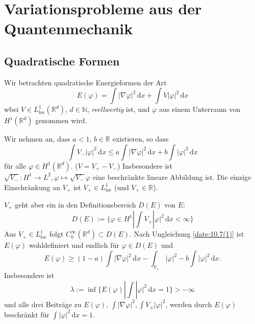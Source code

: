 \documentclass[
paper=a4,
bibtotocnumbered,
liststotocnumbered,
tablecaptionabove,
pointlessnumbers,
twoside,
openright,
10pt
]
{report}
\let\phi\varphi
\theoremstyle{definition}
\numberwithin{equation}{chapter}
\begin{document}
\chapter{Variationsprobleme aus der Quantenmechanik}
\section{Quadratische Formen}
Wir betrachten quadratische Energieformen der Art
\begin{equation}
E(\phi) = \int |\nabla \phi|^2\, \mathrm dx + \int V|\phi|^2\, \mathrm dx
\end{equation}
wbei $V\in L_{\text{loc}}^1(\mathbb R^d)$, $d\in \mathbb N$, \emph{reellwertig} ist, und $\phi$ aus einem Unterraum von $H^1(\mathbb R^d)$ genommen wird. 

Wir nehmen an, dass $a<1$, $b\in \mathbb R$ existieren, so dass 
\begin{equation}\label{date:10.7(1)}
\int V_- |\phi|^2\, \mathrm dx \le a \int |\nabla \phi|^2\, \mathrm dx + b \int |\phi|^2\, \mathrm dx
\end{equation}
für alle $\phi \in H^1(\mathbb R^d)$. ($V= V_+ - V_-$) Insbesondere ist $\sqrt{V_-}: H^1 \to L^2, \phi \mapsto \sqrt{V_-} \phi$ eine beschränkte lineare Abbildung ist.  Die einzige Einschränkung an $V_+$ ist $V_+ \in L^1_{\text{loc}}$ (und $V_+ \in \mathbb R$).

$V_+$ geht aber ein in den Definitionsbereich $D(E)$ von $E$:
\begin{equation}
D(E) := \{ \phi \in H^1| \int V_+ |\phi|^2\, \mathrm dx <\infty\}
\end{equation}
Aus $V_+\in L^1_{\text{loc}}$ folgt $C_0^\infty(\mathbb R^d)\subset D(E)$. Nach Ungleichung \eqref{date:10.7(1)} ist $E(\phi)$ wohldefiniert und endlich für $\phi \in D(E)$ und
\begin{equation}
E(\phi) \ge (1-a) \int |\nabla \phi|^2\, \mathrm dx - \int_{V_+} |\phi|^2- b\int |\phi|^2\, \mathrm dx.
\end{equation}
Insbesondere ist
\begin{equation}
\lambda:= \inf \{ E(\phi) |\int |\phi|^2\, \mathrm dx =1\} >- \infty
\end{equation}
und alle drei Beiträge zu $E(\phi)$, $\int |\nabla \phi|^2, \int V_\pm |\phi|^2$, werden durch $E(\phi)$ beschränkt für $\int |\phi|^2\, \mathrm dx =1$.
\end{document}
